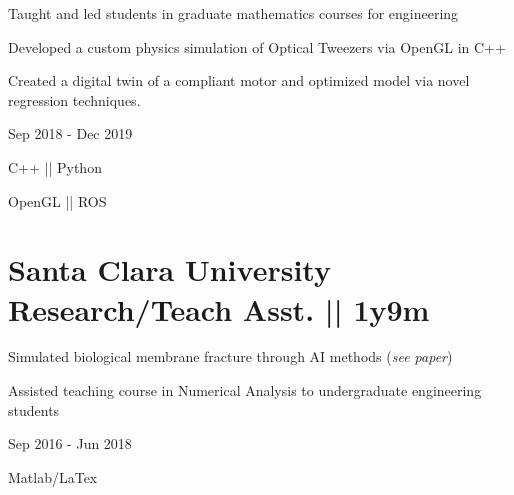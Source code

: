 \begin{detail}
\vspace{-2.5ex}
\BulletItem
Taught and led students in graduate mathematics courses for engineering

\BulletItem
Developed a custom physics simulation of Optical Tweezers via OpenGL in C++

\BulletItem
Created a digital twin of a compliant motor and optimized model via novel regression techniques. 
\end{detail}

\begin{subtitle}
\vspace{-10.8ex}
{{Sep 2018 - Dec 2019}} 
\end{subtitle}

\vspace{2.5ex} 
{\color{cyan}\small {C++ || Python}}

{
\vspace{-2.5ex}\hspace{3.17in} \color{cyan} \small
{OpenGL || ROS} }
\vspace{3.5ex}




\section
{\textbf{Santa Clara University} \newline
Research/Teach Asst. || 1y9m}{}


\begin{detail}
\vspace{-2.5ex}
\BulletItem
Simulated biological membrane fracture through AI methods (\textit{see paper})

\BulletItem
Assisted teaching course in Numerical Analysis to undergraduate engineering students
\end{detail}

\begin{subtitle}
\vspace{-8ex}
{{Sep 2016 - Jun 2018}} 
\end{subtitle}

\vspace{0.5ex} 
{\color{cyan}\small {Matlab/LaTex}}

\vspace{1.5ex}

